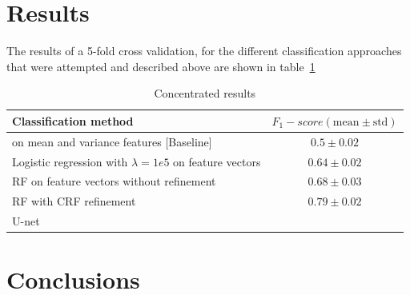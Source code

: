 \documentclass[10pt,conference,compsocconf]{IEEEtran}
\begin{document}
	\section{Results}
	The results of a 5-fold cross validation, for the different classification approaches that were attempted and described above are shown in table~\ref{results}
		\begin{table}
		\begin{tabular}{p{} c}		
			\textbf{Classification method} &  \textbf{$F_1-score (\text{mean}\pm \text{std})$}\\
			\hline \hline
			 on mean and variance features [Baseline] & $0.5 \pm 0.02$ \\ \hline
			Logistic regression with $\lambda = 1e5$ on feature vectors & $0.64 \pm 0.02$ \\ \hline
			RF on feature vectors without refinement & $0.68 \pm 0.03$ \\ \hline
			RF with CRF refinement & $0.79 \pm 0.02$ \\ \hline
			U-net & $ $ \\
			\hline
		\end{tabular}
		\label{results}
		\caption{Concentrated results}
		\end{table}
	\section{Conclusions}
	
	\label{sec:orgheadline9}
	
	
	
	
	\printbibliography
\end{document}
